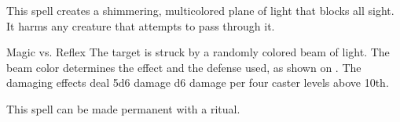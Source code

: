 \begin{spellheader}
\end{spellheader}
\begin{spellcontent}
    \begin{spelltargetinginfo}
    \end{spelltargetinginfo}
    \begin{spelleffects}
        \spelleffect This spell creates a shimmering, multicolored plane of light that blocks all sight. It harms any creature that attempts to pass through it.
        \spelldur{\durshort \dismissable}
    \end{spelleffects}
\end{spellcontent}
\begin{spellsubcontent}
    \begin{spelltargetinginfo}
    \end{spelltargetinginfo}
    \begin{spelleffects}
        \begin{spellattack}{Magic vs. Reflex}
            \spellspecial The target is struck by a randomly colored beam of light. The beam color determines the effect and the defense used, as shown on . The damaging effects deal 5d6 damage \add d6 damage per four caster levels above 10th.
        \end{spellattack}
    \end{spelleffects}
\end{spellsubcontent}
\begin{spellfooter}
    \spellnotes This spell can be made permanent with a  ritual.
\end{spellfooter}

